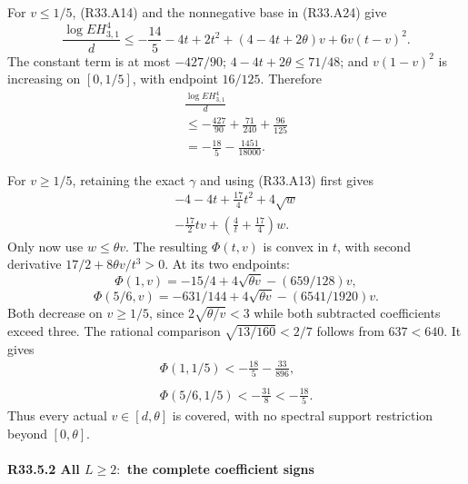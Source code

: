 For \(v\le1/5\), (R33.A14) and the nonnegative base in (R33.A24) give
\[
\frac{\log EH_{3,1}^4}{d}
\le-\frac{14}{5}-4t+2t^2
+(4-4t+2\theta)v+6v(t-v)^2.
\]
The constant term is at most \(-427/90\);
\(4-4t+2\theta\le71/48\);
and \(v(1-v)^2\) is increasing on \([0,\allowbreak \allowbreak  1/5]\), with endpoint
\(16/125\). Therefore
\[
\begin{gathered}
\frac{\log EH_{3,1}^4}{d}\\
\le-\frac{427}{90}+\frac{71}{240}+\frac{96}{125}\\
=-\frac{18}{5}-\frac{1451}{18000}.
\end{gathered}\tag{R33.A26}
\]

For \(v\ge1/5\), retaining the exact \(\gamma\) and using (R33.A13) first
gives
\[
\begin{gathered}
-4-4t+\frac{17}{4}t^2+4\sqrt w\\
-\frac{17}{2}tv+\left(\frac4t+\frac{17}{4}\right)w.
\end{gathered}
\]
Only now use \(w\le\theta v\). The resulting \(\Phi(t,\allowbreak \allowbreak  v)\) is convex
in \(t\), with second derivative \(17/2+8\theta v/t^3>0\).
At its two endpoints:
\[
\Phi(1,v)=-15/4+4\sqrt{\theta v}-(659/128)v,
\]
\[
\Phi(5/6,v)=-631/144+4\sqrt{\theta v}-(6541/1920)v.
\]
Both decrease on \(v\ge1/5\), since
\(2\sqrt{\theta/v}<3\) while both subtracted coefficients exceed three.
The rational comparison \(\sqrt{13/160}<2/7\) follows from \(637<640\).
It gives
\[
\begin{gathered}
\Phi(1,1/5)<-\frac{18}{5}-\frac{33}{896},\\
\qquad\\
\Phi(5/6,1/5)<-\frac{31}{8}<-\frac{18}{5}.
\end{gathered}\tag{R33.A27}
\]
Thus every actual \(v\in[d,\allowbreak \allowbreak  \theta]\) is covered, with no spectral
support restriction beyond \([0,\allowbreak \allowbreak  \theta]\).

\paragraph{R33.5.2 All \(L\ge 2:\) the complete coefficient signs}

